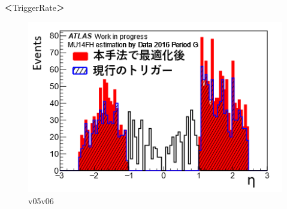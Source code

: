＜TriggerRate＞
\begin{figure}[tb]
  \centering
  \includegraphics[clip, width=12cm]{fig/4/rate_v05_v06.png}
  \caption{v05v06}
  \label{fig:Resolution}
\end{figure}


